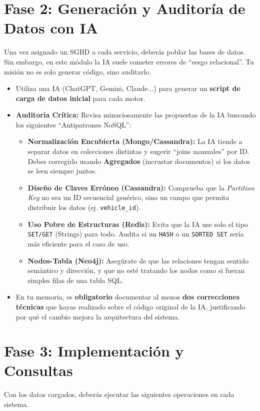 \documentclass[12pt,a4paper]{article}
\begin{document}
\section{Fase 2: Generación y Auditoría de Datos con IA}
Una vez asignado un SGBD a cada servicio, deberás poblar las bases de datos. Sin embargo, en este módulo la IA suele cometer errores de \enquote{sesgo relacional}. Tu misión no es solo generar código, sino auditarlo.

\begin{itemize}
    \item Utiliza una IA (ChatGPT, Gemini, Claude...) para generar un \textbf{script de carga de datos inicial} para cada motor.
    \item \textbf{Auditoría Crítica:} Revisa minuciosamente las propuestas de la IA buscando los siguientes \enquote{Antipatrones NoSQL}:
    \begin{itemize}
        \item \textbf{Normalización Encubierta (Mongo/Cassandra):} La IA tiende a separar datos en colecciones distintas y sugerir \enquote{joins manuales} por ID. Debes corregirlo usando \textbf{Agregados} (incrustar documentos) si los datos se leen siempre juntos.
        \item \textbf{Diseño de Claves Erróneo (Cassandra):} Comprueba que la \textit{Partition Key} no sea un ID secuencial genérico, sino un campo que permita distribuir los datos (ej. \texttt{vehicle\_id}).
        \item \textbf{Uso Pobre de Estructuras (Redis):} Evita que la IA use solo el tipo \texttt{SET/GET} (Strings) para todo. Audita si un \texttt{HASH} o un \texttt{SORTED SET} sería más eficiente para el caso de uso.
        \item \textbf{Nodos-Tabla (Neo4j):} Asegúrate de que las relaciones tengan sentido semántico y dirección, y que no esté tratando los nodos como si fueran simples filas de una tabla SQL.
    \end{itemize}
    \item En tu memoria, es \textbf{obligatorio} documentar al menos \textbf{dos correcciones técnicas} que hayas realizado sobre el código original de la IA, justificando por qué el cambio mejora la arquitectura del sistema.
\end{itemize}

\section{Fase 3: Implementación y Consultas}
Con los datos cargados, deberás ejecutar las siguientes operaciones en cada sistema.
\end{document}
